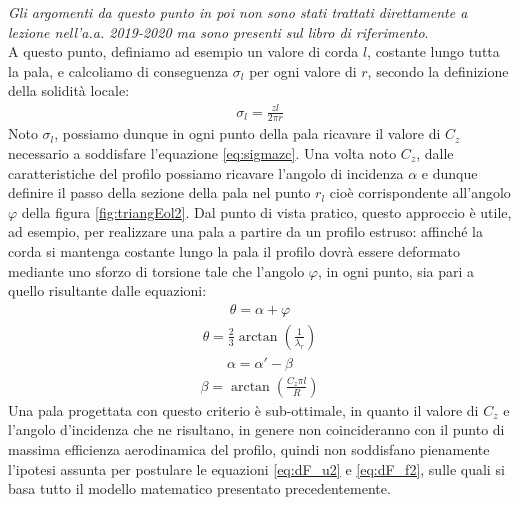 \textit{Gli argomenti da questo punto in poi non sono stati trattati direttamente a lezione nell'a.a. 2019-2020 ma sono presenti sul libro di riferimento}.\\

A questo punto, definiamo ad esempio un valore di corda $l$, costante lungo  tutta la pala, e calcoliamo di conseguenza $\sigma_l$ per ogni valore di $r$, secondo la definizione della solidità locale:
\begin{align*}
\sigma_l = \frac{z l}{2 \pi r}
\end{align*}
Noto $\sigma_l$, possiamo dunque in ogni punto della pala ricavare il valore di $C_z$ necessario a soddisfare l'equazione \ref{eq:sigmazc}. Una volta noto $C_z$, dalle caratteristiche del profilo possiamo ricavare l'angolo di incidenza $\alpha$ e dunque definire il passo della sezione della pala nel punto $r_l$ cioè corrispondente all'angolo $\varphi$ della figura \ref{fig:triangEol2}. Dal punto di vista pratico, questo approccio è utile, ad esempio, per realizzare una pala a partire da un profilo estruso: affinché la corda si mantenga costante lungo la pala il profilo dovrà essere deformato mediante uno sforzo di torsione tale che l'angolo $\varphi$, in ogni punto, sia pari a quello risultante dalle equazioni:
\begin{align*}
\theta = \alpha + \varphi
\end{align*}
\begin{align*}
\theta = \frac{2}{3} \arctan \left( \frac{1}{\lambda_r} \right)
\end{align*}
\begin{align*}
\alpha = \alpha' - \beta
\end{align*}
\begin{align*}
\beta = \arctan \left( \frac{C_z \pi l}{R} \right)
\end{align*}
Una pala progettata con questo criterio è sub-ottimale, in quanto il valore di $C_z$ e l'angolo d'incidenza che ne risultano, in genere non coincideranno con il punto di massima efficienza aerodinamica del profilo, quindi non soddisfano pienamente l'ipotesi assunta per postulare le equazioni \ref{eq:dF_u2} e \ref{eq:dF_f2}, sulle quali si basa tutto il modello matematico presentato precedentemente.


